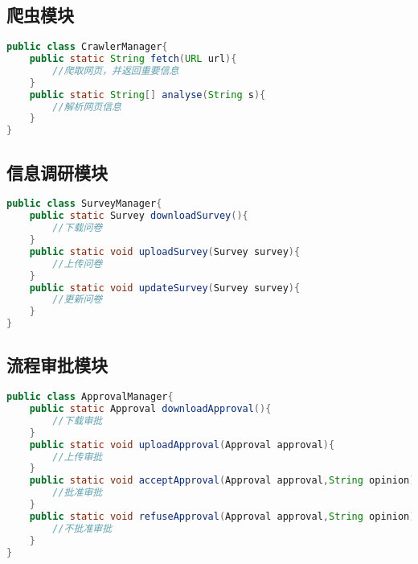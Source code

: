 {\color{red}

\subsection{\color{red}爬虫模块}
\begin{lstlisting}[language=Java, caption=爬虫模块接口]
public class CrawlerManager{
    public static String fetch(URL url){
        //爬取网页，并返回重要信息
    } 
    public static String[] analyse(String s){
        //解析网页信息
    }
}
\end{lstlisting}

\subsection{\color{red}信息调研模块}
\begin{lstlisting}[language=Java, caption=信息调研模块接口]
public class SurveyManager{
    public static Survey downloadSurvey(){
        //下载问卷
    }
    public static void uploadSurvey(Survey survey){
        //上传问卷
    }
    public static void updateSurvey(Survey survey){
        //更新问卷
    }
}
\end{lstlisting}


\subsection{\color{red}流程审批模块}
\begin{lstlisting}[language=Java, caption=流程模块接口]
public class ApprovalManager{
    public static Approval downloadApproval(){
        //下载审批
    }
    public static void uploadApproval(Approval approval){
        //上传审批
    }
    public static void acceptApproval(Approval approval,String opinion){
        //批准审批
    }
    public static void refuseApproval(Approval approval,String opinion){
        //不批准审批
    }
}
\end{lstlisting}


}
